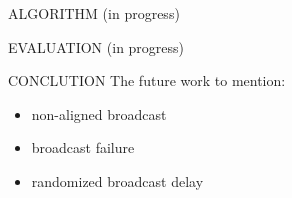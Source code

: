 \documentclass[10pt, conference, letterpaper]{IEEEtran}
\begin{document}
    \begin{section}{ALGORITHM}
        \label{sec:algorithm}
        (in progress)
    \end{section}

    \begin{section}{EVALUATION}
        \label{sec:evaluation}
        (in progress)
    \end{section}

    \begin{section}{CONCLUTION}
        \label{sec:conclusion}
        The future work to mention:
        \begin{itemize}
            \item non-aligned broadcast
            \item broadcast failure
            \item randomized broadcast delay
        \end{itemize}
    \end{section}

    
    
\end{document}

